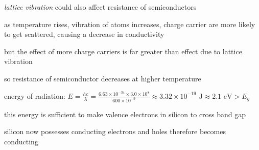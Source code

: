 \cmt \emph{lattice vibration} could also affect resistance of semiconductors

as temperature rises, vibration of atoms increases, charge carrier are more likely to get scattered, causing a decrease in conductivity

but the effect of more charge carriers is far greater than effect due to lattice vibration

so resistance of semiconductor decreases at higher temperature


\sol energy of radiation: $E=\frac{hc}{\lambda} = \frac{6.63\times10^{-34}\times3.0\times10^8}{600\times10^{-9}} \approx 3.32\times10^{-19} \text{ J} \approx 2.1 \text{ eV} > E_g$

this energy is sufficient to make valence electrons in silicon to cross band gap

silicon now possesses conducting electrons and holes therefore becomes conducting \eoe




